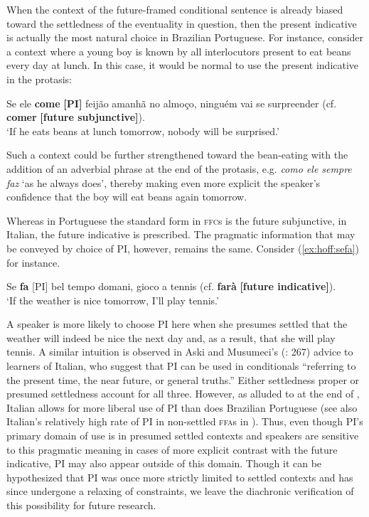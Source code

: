 \documentclass[output=paper,colorlinks,citecolor=brown]{langscibook}
\begin{document}
When the context of the future-framed conditional sentence is already biased toward the settledness of the eventuality in question, then the present indicative is actually the most natural choice in Brazilian Portuguese. For instance, consider a context where a young boy is known by all interlocutors present to eat beans every day at lunch. In this case, it would be normal to use the present indicative in the protasis:

\begin{exe}
\ex\label{ex:hoff:seelecome} Se ele \textbf{come} \textbf{[PI]} feijão amanhã no almoço, ninguém vai se surpreender (cf. \textbf{comer} \textbf{[future subjunctive]}). \\
`If he eats beans at lunch tomorrow, nobody will be surprised.'
\end{exe}

Such a context could be further strengthened toward the bean-eating with the addition of an adverbial phrase at the end of the protasis, e.g. \textit{como ele sempre faz} `as he always does', thereby making even more explicit the speaker’s confidence that the boy will eat beans again tomorrow.

Whereas in Portuguese the standard form in \textsc{ffc}s is the future subjunctive, in Italian, the future indicative is prescribed. The pragmatic information that may be conveyed by choice of PI, however, remains the same. Consider (\ref{ex:hoff:sefa}) for instance.

\begin{exe}
\ex\label{ex:hoff:sefa} Se \textbf{fa} [PI] bel tempo domani, gioco a tennis (cf. \textbf{farà} \textbf{[future indicative]}).\\
`If the weather is nice tomorrow, I’ll play tennis.'
\end{exe}

A speaker is more likely to choose PI here when she presumes settled that the weather will indeed be nice the next day and, as a result, that she will play tennis. A similar intuition is observed in Aski and Musumeci’s (\citeyear{AskiMusumeci2014}: 267) advice to learners of Italian, who suggest that PI can be used in conditionals ``referring to the present time, the near future, or general truths.'' Either settledness proper or presumed settledness account for all three. However, as alluded to at the end of , Italian allows for more liberal use of PI than does Brazilian Portuguese (see also Italian’s relatively high rate of PI in non-settled \textsc{ffa}s in ). Thus, even though PI’s primary domain of use is in presumed settled contexts and speakers are sensitive to this pragmatic meaning in cases of more explicit contrast with the future indicative, PI may also appear outside of this domain. Though it can be hypothesized that PI was once more strictly limited to settled contexts and has since undergone a relaxing of constraints, we leave the diachronic verification of this possibility for future research.
\end{document}
